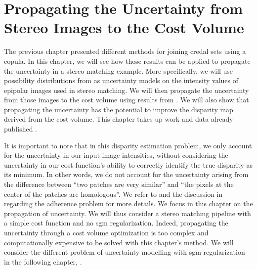 \chapter{Propagating the Uncertainty from Stereo Images to the Cost Volume}\label{chap:propagating}
 The previous chapter presented different methods for joining credal sets using a copula. In this chapter, we will see how those results can be applied to propagate the uncertainty in a stereo matching example. More specifically, we will use possibility distributions from  as uncertainty models on the intensity values of epipolar images used in stereo matching. We will then propagate the uncertainty from those images to the cost volume using results from . We will also show that propagating the uncertainty has the potential to improve the disparity map derived from the cost volume. This chapter takes up work and data already published \cite{malinowski_copulas_2022, malinowski_uncertainty_2023}.

It is important to note that in this disparity estimation problem, we only account for the uncertainty in our input image intensities, without considering the uncertainty in our cost function's ability to correctly identify the true disparity as its minimum. In other words, we do not account for the uncertainty arising from the difference between ``two patches are very similar'' and ``the pixels at the center of the patches are homologous''. We refer to  and the discussion in  regarding the adherence problem for more details. We focus in this chapter on the propagation of uncertainty. We will thus consider a stereo matching pipeline with a simple cost function and no \acrshort{sgm} regularization. Indeed, propagating the uncertainty through a cost volume optimization is too complex and computationally expensive to be solved with this chapter's method. We will consider the different problem of uncertainty modelling with \acrshort{sgm} regularization in the following chapter, . 

